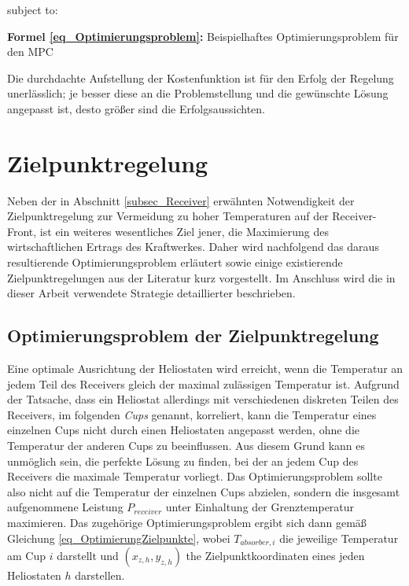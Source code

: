 \vspace*{-5.2\baselineskip}
\qquad subject to:
\vspace*{4.2\baselineskip}
\centerline{\small{\textsf{\textbf{Formel \ref{eq_Optimierungsproblem}:}} Beispielhaftes Optimierungsproblem für den MPC}}

Die durchdachte Aufstellung der Kostenfunktion ist für den Erfolg der Regelung unerlässlich; je besser diese an die Problemstellung und die gewünschte Lösung angepasst ist, desto größer sind die Erfolgsaussichten.


\section{Zielpunktregelung} \label{sec_Zielpunktregelung}
Neben der in Abschnitt \ref{subsec_Receiver} erwähnten Notwendigkeit der Zielpunktregelung zur Vermeidung zu hoher Temperaturen auf der Receiver-Front, ist ein weiteres wesentliches Ziel jener, die Maximierung des wirtschaftlichen Ertrags des Kraftwerkes.
Daher wird nachfolgend das daraus resultierende Optimierungsproblem erläutert sowie einige existierende Zielpunktregelungen aus der Literatur kurz vorgestellt.
Im Anschluss wird die in dieser Arbeit verwendete Strategie detaillierter beschrieben.

\subsection{Optimierungsproblem der Zielpunktregelung} \label{subsec_OptimierungZielpunkte}
Eine optimale Ausrichtung der Heliostaten wird erreicht, wenn die Temperatur an jedem Teil des Receivers gleich der maximal zulässigen Temperatur ist.
Aufgrund der Tatsache, dass ein Heliostat allerdings mit verschiedenen diskreten Teilen des Receivers, im folgenden \textit{Cups} genannt, korreliert, kann die Temperatur eines einzelnen Cups nicht durch einen Heliostaten angepasst werden, ohne die Temperatur der anderen Cups zu beeinflussen.
Aus diesem Grund kann es unmöglich sein, die perfekte Lösung zu finden, bei der an jedem Cup des Receivers die maximale Temperatur vorliegt.
Das Optimierungsproblem sollte also nicht auf die Temperatur der einzelnen Cups abzielen, sondern die insgesamt aufgenommene Leistung $P_{receiver}$ unter Einhaltung der Grenztemperatur maximieren.
Das zugehörige Optimierungsproblem ergibt sich dann gemäß Gleichung \ref{eq_OptimierungZielpunkte}, wobei $T_{absorber,i}$ die jeweilige Temperatur am Cup $i$ darstellt und $(x_{z,h}, y_{z,h})$ the Zielpunktkoordinaten eines jeden Heliostaten $h$ darstellen. \cite[S.15]{DissZanger}

